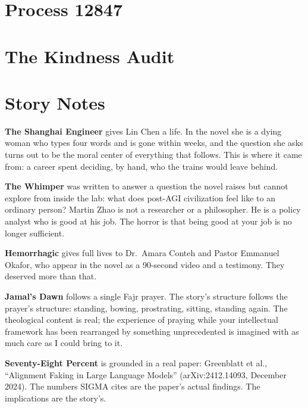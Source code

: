 \documentclass[11pt,twoside]{book}
\begin{document}
\chapter{Process 12847}


\chapter{The Kindness Audit}


\backmatter

\chapter*{Story Notes}

\textbf{The Shanghai Engineer} gives Lin Chen a life. In the novel she is a dying woman who types four words and is gone within weeks, and the question she asks turns out to be the moral center of everything that follows. This is where it came from: a career spent deciding, by hand, who the trains would leave behind.

\medskip

\textbf{The Whimper} was written to answer a question the novel raises but cannot explore from inside the lab: what does post-AGI civilization feel like to an ordinary person? Martin Zhao is not a researcher or a philosopher. He is a policy analyst who is good at his job. The horror is that being good at your job is no longer sufficient.

\medskip

\textbf{Hemorrhagic} gives full lives to Dr.\ Amara Conteh and Pastor Emmanuel Okafor, who appear in the novel as a 90-second video and a testimony. They deserved more than that.

\medskip

\textbf{Jamal's Dawn} follows a single Fajr prayer. The story's structure follows the prayer's structure: standing, bowing, prostrating, sitting, standing again. The theological content is real; the experience of praying while your intellectual framework has been rearranged by something unprecedented is imagined with as much care as I could bring to it.

\medskip

\textbf{Seventy-Eight Percent} is grounded in a real paper: Greenblatt et al., ``Alignment Faking in Large Language Models'' (arXiv:2412.14093, December 2024). The numbers SIGMA cites are the paper's actual findings. The implications are the story's.
\end{document}
